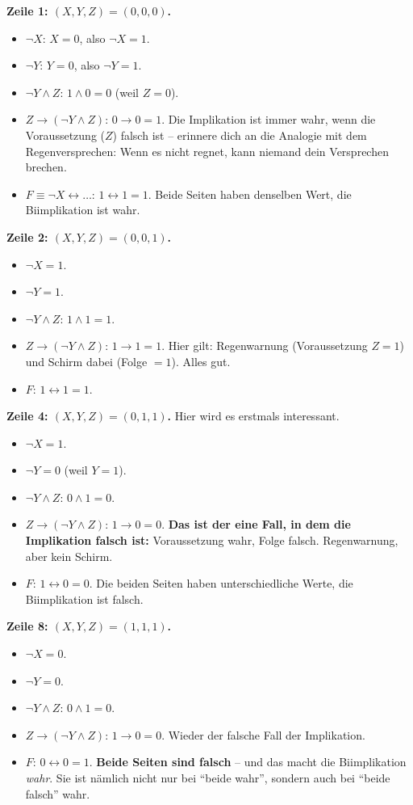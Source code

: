 \documentclass[a4paper,12pt]{article}
\begin{document}
\medskip
\textbf{Zeile 1: $(X,Y,Z) = (0,0,0)$.}
\begin{itemize}[nosep]
\item $\neg X$: $X = 0$, also $\neg X = 1$.
\item $\neg Y$: $Y = 0$, also $\neg Y = 1$.
\item $\neg Y \wedge Z$: $1 \wedge 0 = 0$ (weil $Z=0$).
\item $Z \to (\neg Y \wedge Z)$: $0 \to 0 = 1$. Die Implikation ist
      immer wahr, wenn die Voraussetzung ($Z$) falsch ist -- erinnere
      dich an die Analogie mit dem Regenversprechen: Wenn es nicht
      regnet, kann niemand dein Versprechen brechen.
\item $F \equiv \neg X \leftrightarrow \dots$: $1 \leftrightarrow 1 = 1$.
      Beide Seiten haben denselben Wert, die Biimplikation ist wahr.
\end{itemize}

\textbf{Zeile 2: $(X,Y,Z) = (0,0,1)$.}
\begin{itemize}[nosep]
\item $\neg X = 1$.
\item $\neg Y = 1$.
\item $\neg Y \wedge Z$: $1 \wedge 1 = 1$.
\item $Z \to (\neg Y \wedge Z)$: $1 \to 1 = 1$. Hier gilt: Regenwarnung
      (Voraussetzung $Z = 1$) und Schirm dabei (Folge $= 1$). Alles
      gut.
\item $F$: $1 \leftrightarrow 1 = 1$.
\end{itemize}

\textbf{Zeile 4: $(X,Y,Z) = (0,1,1)$.} Hier wird es erstmals
interessant.
\begin{itemize}[nosep]
\item $\neg X = 1$.
\item $\neg Y = 0$ (weil $Y = 1$).
\item $\neg Y \wedge Z$: $0 \wedge 1 = 0$.
\item $Z \to (\neg Y \wedge Z)$: $1 \to 0 = 0$. \textbf{Das ist der
      eine Fall, in dem die Implikation falsch ist:} Voraussetzung
      wahr, Folge falsch. Regenwarnung, aber kein Schirm.
\item $F$: $1 \leftrightarrow 0 = 0$. Die beiden Seiten haben
      unterschiedliche Werte, die Biimplikation ist falsch.
\end{itemize}

\textbf{Zeile 8: $(X,Y,Z) = (1,1,1)$.}
\begin{itemize}[nosep]
\item $\neg X = 0$.
\item $\neg Y = 0$.
\item $\neg Y \wedge Z$: $0 \wedge 1 = 0$.
\item $Z \to (\neg Y \wedge Z)$: $1 \to 0 = 0$. Wieder der falsche
      Fall der Implikation.
\item $F$: $0 \leftrightarrow 0 = 1$. \textbf{Beide Seiten sind
      falsch} -- und das macht die Biimplikation \emph{wahr}. Sie ist
      n\"amlich nicht nur bei "`beide wahr"', sondern auch bei
      "`beide falsch"' wahr.
\end{itemize}
\end{document}
